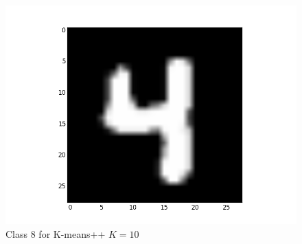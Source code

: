 \documentclass[submit]{harvardml}
\begin{document}
\begin{figure}[ht]
    \includegraphics[scale=0.20]{K10-representative-7-2}
    \caption{Class 8 for K-means++ $K=10$}
\end{figure}
\end{document}
